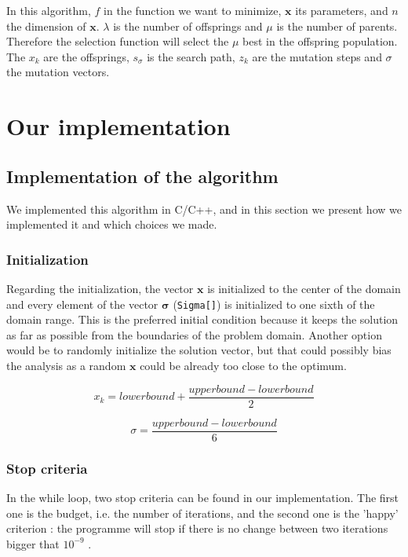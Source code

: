 \documentclass[transmag]{IEEEtran}
\begin{document}
In this algorithm, $f$ in the function we want to minimize, $\bm{x}$ its parameters, and $n$ the dimension of $\bm{x}$. $\lambda$ is the number of offsprings and $\mu$ is the number of parents. Therefore the selection function will select the $\mu$ best in the offspring population. The $x_k$ are the offsprings, $s_{\sigma}$ is the search path, $z_k$ are the mutation steps and $\sigma$ the mutation vectors. 

\section{Our implementation}

\subsection{Implementation of the algorithm}
We implemented this algorithm in C/C++, and in this section we present how we implemented it and which choices we made. 

\subsubsection{Initialization}

Regarding the initialization, the vector $\bm{x}$ is initialized to the center of the domain and every element of the vector $\bm{\sigma}$ (\verb|Sigma[]|) is initialized to one sixth of the domain range. This is the preferred initial condition because it keeps the solution as far as possible from the boundaries of the problem domain. Another option would be to randomly initialize the solution vector, but that could possibly bias the analysis as a random $\bm{x}$ could be already too close to the optimum.

$$x_k = lower bound + \frac{upper bound - lower bound}{2} $$

$$\sigma = \frac{upper bound - lower bound}{6}$$

\subsubsection{Stop criteria}
In the while loop, two stop criteria can be found in our implementation. The first one is the budget, i.e. the number of iterations, and the second one is the 'happy' criterion : the programme will stop if there is no change between two iterations bigger that $10^{-9}$ .
\end{document}
